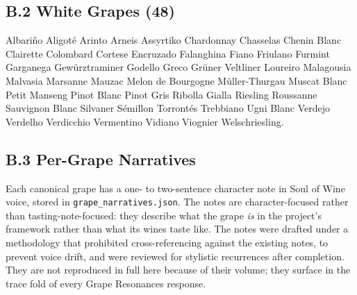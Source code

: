 \documentclass[11pt]{article}
\begin{document}
\subsection*{B.2 White Grapes (48)}

\begin{small}
\noindent
Albari\~no \textperiodcentered{} Aligot\'e \textperiodcentered{} Arinto \textperiodcentered{} Arneis \textperiodcentered{} Assyrtiko \textperiodcentered{} Chardonnay \textperiodcentered{} Chasselas \textperiodcentered{} Chenin Blanc \textperiodcentered{} Clairette \textperiodcentered{} Colombard \textperiodcentered{} Cortese \textperiodcentered{} Encruzado \textperiodcentered{} Falanghina \textperiodcentered{} Fiano \textperiodcentered{} Friulano \textperiodcentered{} Furmint \textperiodcentered{} Garganega \textperiodcentered{} Gew\"urztraminer \textperiodcentered{} Godello \textperiodcentered{} Greco \textperiodcentered{} Gr\"uner Veltliner \textperiodcentered{} Loureiro \textperiodcentered{} Malagousia \textperiodcentered{} Malvasia \textperiodcentered{} Marsanne \textperiodcentered{} Mauzac \textperiodcentered{} Melon de Bourgogne \textperiodcentered{} M\"uller-Thurgau \textperiodcentered{} Muscat Blanc \textperiodcentered{} Petit Manseng \textperiodcentered{} Pinot Blanc \textperiodcentered{} Pinot Gris \textperiodcentered{} Ribolla Gialla \textperiodcentered{} Riesling \textperiodcentered{} Roussanne \textperiodcentered{} Sauvignon Blanc \textperiodcentered{} Silvaner \textperiodcentered{} S\'emillon \textperiodcentered{} Torront\'es \textperiodcentered{} Trebbiano \textperiodcentered{} Ugni Blanc \textperiodcentered{} Verdejo \textperiodcentered{} Verdelho \textperiodcentered{} Verdicchio \textperiodcentered{} Vermentino \textperiodcentered{} Vidiano \textperiodcentered{} Viognier \textperiodcentered{} Welschriesling.
\end{small}

\subsection*{B.3 Per-Grape Narratives}

Each canonical grape has a one- to two-sentence character note in Soul of Wine voice, stored in \texttt{grape\_narratives.json}. The notes are character-focused rather than tasting-note-focused: they describe what the grape \emph{is} in the project's framework rather than what its wines taste like. The notes were drafted under a methodology that prohibited cross-referencing against the existing notes, to prevent voice drift, and were reviewed for stylistic recurrences after completion. They are not reproduced in full here because of their volume; they surface in the trace fold of every Grape Resonances response.
\end{document}
